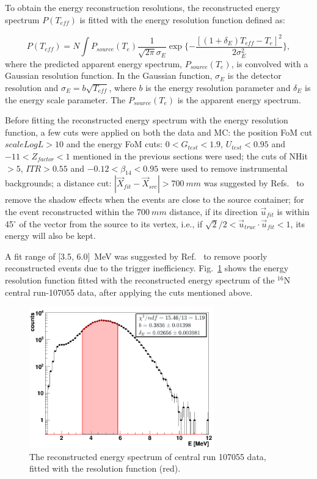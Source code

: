 To obtain the energy reconstruction resolutions, the reconstructed energy spectrum $P(T_{eff})$ is fitted with the energy resolution function defined as\cite{waterunidoc}:

\begin{equation}
P(T_{eff})=N\int P_{source}(T_e)\frac{1}{\sqrt{2\pi}\sigma_E}\exp \{-\frac{[(1+\delta_E)T_{eff}-T_e]^2}{2\sigma_E^2}\},
\end{equation}
where the predicted apparent energy spectrum, $P_{source}(T_e)$, is convolved with a Gaussian resolution function. In the Gaussian function, $\sigma_E$ is the detector resolution and $\sigma_E = b\sqrt {T_{eff}}$, where $b$ is the energy resolution parameter and $\delta_E$ is the energy scale parameter. The $P_{source}(T_e)$ is the apparent energy spectrum.

Before fitting the reconstructed energy spectrum with the energy resolution function, a few cuts were applied on both the data and MC: the position FoM cut $scaleLogL>10$ and the energy FoM cuts: $0<G_{test}<1.9$, $U_{test}<0.95$ and $-11<Z_{factor}<1$ mentioned in the previous sections were used; the cuts of NHit$>5$, $ITR>0.55$ and $-0.12<\beta_{14}<0.95$ were used to remove instrumental backgrounds; a distance cut: $|\vec{X}_{fit}-\vec{X}_{src}|>700~mm$ was suggested by Refs.~\cite{leta,waterunidoc} to remove the shadow effects when the events are close to the source container; for the event reconstructed within the $700~mm$ distance, if its direction $\vec{u}_{fit}$ is within 45$^\circ$ of the vector from the source to its vertex, i.e., if $\sqrt2/2<\vec{u}_{true}\cdot \vec{u}_{fit}<1$, its energy will also be kept.

A fit range of [3.5, 6.0]~MeV was suggested by Ref.~\cite{waterunidoc} to remove poorly reconstructed events due to the trigger inefficiency. Fig.~\ref{fittedEnergyResol} shows the energy resolution function fitted with the reconstructed energy spectrum of the $^{16}$N central run-107055 data, after applying the cuts mentioned above.
\begin{figure}
	\centering
	\includegraphics[width=8cm]{N16data_energy_fitted_107055.png}
	\caption[The reconstructed energy spectrum fitted with resolution function.]{The reconstructed energy spectrum of central run 107055 data, fitted with the resolution function (red).}
	\label{fittedEnergyResol}
\end{figure}

